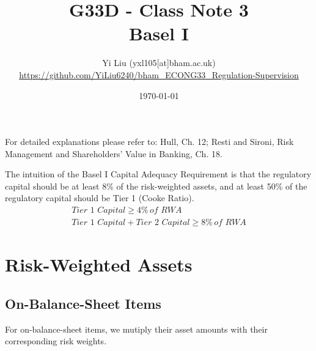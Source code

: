 \documentclass[12pt]{article}
\author{Yi Liu (yxl105[at]bham.ac.uk)\\\scriptsize{\url{https://github.com/YiLiu6240/bham_ECONG33_Regulation-Supervision}}}
\date{\today}
\title{G33D - Class Note 3\\Basel I}
\begin{document}
\maketitle
\tableofcontents
\newpage

For detailed explanations please refer to: Hull, Ch. 12; Resti and Sironi, Risk Management and Shareholders’ Value in Banking, Ch. 18.

The intuition of the Basel I Capital Adequacy Requirement is that the regulatory capital should be at least 8\% of the risk-weighted assets, and at least 50\% of the regulatory capital should be Tier 1 (Cooke Ratio).
\begin{align*}
  \textit{Tier 1 Capital} \geq 4\% \, \textit{of RWA} \\
  \textit{Tier 1 Capital} + \textit{Tier 2 Capital} \geq 8\% \, \textit{of RWA}
\end{align*}

\section{Risk-Weighted Assets}

\subsection{On-Balance-Sheet Items}

For on-balance-sheet items, we mutiply their asset amounts with their corresponding risk weights.
\end{document}
